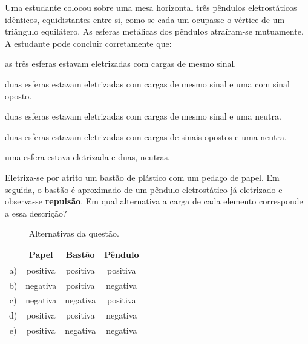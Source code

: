 \begin{questao}[2]{}

Uma estudante colocou sobre uma mesa horizontal três pêndulos eletrostáticos
idênticos, equidistantes entre si, como se cada um ocupasse o vértice de um
triângulo equilátero. As esferas metálicas dos pêndulos atraíram-se mutuamente.
A estudante pode concluir corretamente que:
\begin{alternativas}
\item as três esferas estavam eletrizadas com cargas de mesmo sinal.
\item duas esferas estavam eletrizadas com cargas de mesmo sinal e uma com sinal oposto.
\item duas esferas estavam eletrizadas com cargas de mesmo sinal e uma neutra.
\item duas esferas estavam eletrizadas com cargas de sinais opostos e uma neutra.
\item uma esfera estava eletrizada e duas, neutras.
\end{alternativas}


\end{questao}
\begin{questao}[2]{}

Eletriza-se por atrito um bastão de plástico com um pedaço de papel. Em seguida,
o bastão é aproximado de um pêndulo eletrostático já eletrizado e observa-se
\textbf{repulsão}. Em qual alternativa a carga de cada elemento corresponde a
essa descrição?

\begin{table}[H]
\centering
\small\sffamily
\setlength{\arraystretch}{1.25}
\begin{tabular}{@{}c c c c@{}}
\toprule
 & \textbf{Papel} & \textbf{Bastão} & \textbf{Pêndulo}\\
\midrule
a) & positiva & positiva & positiva\\
b) & negativa & positiva & negativa\\
c) & negativa & negativa & positiva\\
d) & positiva & positiva & negativa\\
e) & positiva & negativa & negativa\\
\bottomrule
\end{tabular}
\caption{Alternativas da questão.}
\end{table}


\end{questao}
